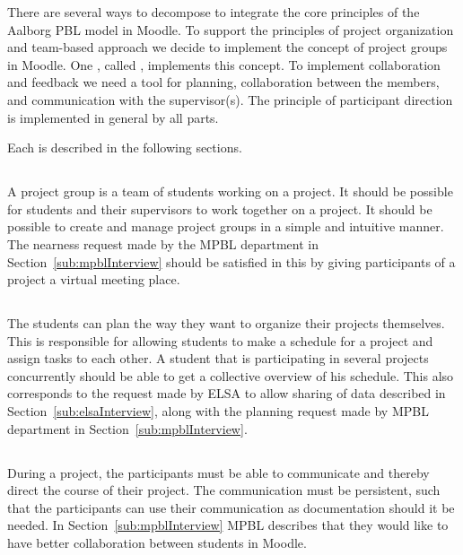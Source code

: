 There are several ways to decompose \system{} to integrate the core principles of the Aalborg PBL model in Moodle. 
To support the principles of project organization and team-based approach we decide to implement the concept of project groups in Moodle. 
One \subsystem{}, called \administrationgroup{}, implements this concept.
To implement collaboration and feedback we need a tool for planning, collaboration between the members, and communication with the supervisor(s). 
The principle of participant direction is implemented in general by all parts. 

Each \subsystem{} is described in the following sections.

\subsection{\administrationgroup{}} %
\label{sec:admgroupdecom}
A project group is a team of students working on a project.
It should be possible for students and their supervisors to work together on a project.
It should be possible to create and manage project groups in a simple and intuitive manner.
The nearness request made by the MPBL department in Section~\ref{sub:mpblInterview} should be satisfied in this \subsystem{} by giving participants of a project a virtual meeting place.

\subsection{\timelinegroup{}} %
\label{sec:tmlgroupdecom}
The students can plan the way they want to organize their projects themselves.
This \subsystem{} is responsible for allowing students to make a schedule for a project and assign tasks to each other.
A student that is participating in several projects concurrently should be able to get a collective overview of his schedule.
This also corresponds to the request made by ELSA to allow sharing of data described in Section~\ref{sub:elsaInterview}, along with the planning request made by MPBL department in Section~\ref{sub:mpblInterview}.

\subsection{\blackboardgroup{}} %
During a project, the participants must be able to communicate and thereby direct the course of their project.
The communication must be persistent, such that the participants can use their communication as documentation should it be needed.
In Section~\ref{sub:mpblInterview} MPBL describes that they would like to have better collaboration between students in Moodle.

